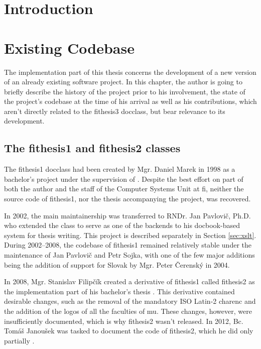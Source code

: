\documentclass[12pt,twoside,cover,color,table]%
  {fithesis3/fithesis3/fithesis3} %
\makeatletter
\def\thesis#1{\makeatletter\thesis@{#1}\makeatother}
\makeatother
\begin{document}
\chapter{Introduction}
\chapter{Existing Codebase}\label{sec:init-state}
  The implementation part of this thesis concerns the development
  of a new version of an already existing software project. In this
  chapter, the author is going to briefly describe the history of
  the project prior to his involvement, the state of the project's
  codebase at the time of his arrival as well as his contributions,
  which aren't directly related to the \textsf{fithesis3}
  \gls{docclass}, but bear relevance to its development.

  \section{The \textsf{fithesis1} and \textsf{fithesis2}
    classes}
  The \textsf{fithesis1} \gls{docclass} had been created by Mgr.
  Daniel Marek in 1998 as a bachelor's project under the
  supervision of \thesis{advisor}. Despite the best effort on part
  of both the author and the staff of the Computer Systems Unit at
  \gls{fi}, neither the source code of \textsf{fithesis1}, nor the
  thesis accompanying the project, was recovered.

  In 2002, the main maintainership was transferred to RNDr. Jan
  Pavlovič, Ph.D. who extended the class to serve as one of the
  backends to his \gls{docbook}-based system for thesis writing.
  This project is described separately in Section \ref{sec:xslt}.
  During 2002--2008, the codebase of \textsf{fithesis1} remained
  relatively stable under the maintenance of Jan Pavlovič and Petr
  Sojka, with one of the few major additions being the addition of
  support for Slovak by Mgr. Peter Čerenský in 2004.

  In 2008, Mgr. Stanislav Filipčík created a derivative of
  \textsf{fithesis1} called \textsf{fithesis2} as the
  implementation part of his bachelor's thesis \cite{Filipcik09}.
  This derivative contained desirable changes, such as the removal
  of the mandatory ISO Latin-2 \gls{charenc} and the addition of
  the logos of all the faculties of \gls{mu}. These changes,
  however, were insufficiently documented, which is why
  \textsf{fithesis2} wasn't released. In 2012, Bc. Tomáš Janoušek
  was tasked to document the code of \textsf{fithesis2}, which he
  did only partially \cite{fithesis2Code}.
\end{document}
